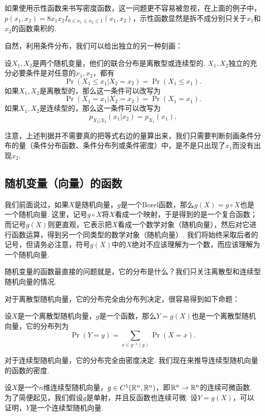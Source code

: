 如果使用示性函数来书写密度函数，这一问题更不容易被忽视，在上面的例子中，$p(x_1,x_2)=8x_1x_2I_{0\leq x_1\leq x_2\leq 1}(x_1,x_2)$，示性函数显然是拆不成分别只关于$x_1$和$x_2$的函数乘积的. 

自然，利用条件分布，我们可以给出独立的另一种刻画：

\begin{proposition}\label{proposition:independence-conditional}
设$X_1,X_2$是两个随机变量，他们的联合分布是离散型或连续型的. $X_1,X_2$独立的充分必要条件是对任意的$x_1,x_2$，都有
\[\Pr(X_1\leq x_1|X_2=x_2)=\Pr(X_1\leq x_1).\]
如果$X_1,X_2$是离散型的，那么这一条件可以改写为
\[\Pr(X_1=x_1|X_2=x_2)=\Pr(X_1=x_1).\]
如果$X_1,X_2$是连续型的，那么这一条件可以改写为
\[p_{X_1|X_2}(x_1|x_2)=p_{X_1}(x_1).\]
\end{proposition}

注意，上述判据并不需要真的把等式右边的量算出来，我们只需要判断刻画条件分布的量（条件分布函数、条件分布列或条件密度）中，是不是只出现了$x_1$而没有出现$x_2$. 

\subsection{随机变量（向量）的函数}\label{subsec:random-function}

我们前面说过，如果$X$是随机向量，$g$是一个Borel函数，那么$g(X)=g\circ X$也是一个随机向量. 这里，记号$g\circ X$将$X$看成一个映射，于是得到的是一个复合函数；而记号$g(X)$则更直观，它表示把$X$看成一个数学对象（随机向量），然后对它进行函数运算，得到另一个同类型的数学对象（随机向量）. 我们将始终采取后者的记号，但请务必注意，符号$g(X)$中的$X$绝对不应该理解为一个数，而应该理解为一个随机向量. 

随机变量的函数最直接的问题就是，它的分布是什么？我们只关注离散型和连续型随机向量的情况.

对于离散型随机向量，它的分布完全由分布列决定，很容易得到如下命题：

\begin{theorem}\label{theorem:discrete-function}
设$X$是一个离散型随机向量，$g$是一个函数，那么$Y=g(X)$也是一个离散型随机向量，它的分布列为
\[\Pr(Y=y)=\sum_{x\in g^{-1}(y)}\Pr(X=x).\]
\end{theorem}

对于连续型随机向量，它的分布完全由密度决定. 我们现在来推导连续型随机向量的函数的密度. 

设$X$是一个$n$维连续型随机向量，$g\in C^1(\mathbb{R}^n,\mathbb{R}^n)$，即$\mathbb{R}^n\to\mathbb{R}^n$的连续可微函数. 为了简便起见，我们假设$g$是单射，并且反函数也连续可微. 设$Y=g(X)$，可以证明，$Y$是一个连续型随机向量. 

